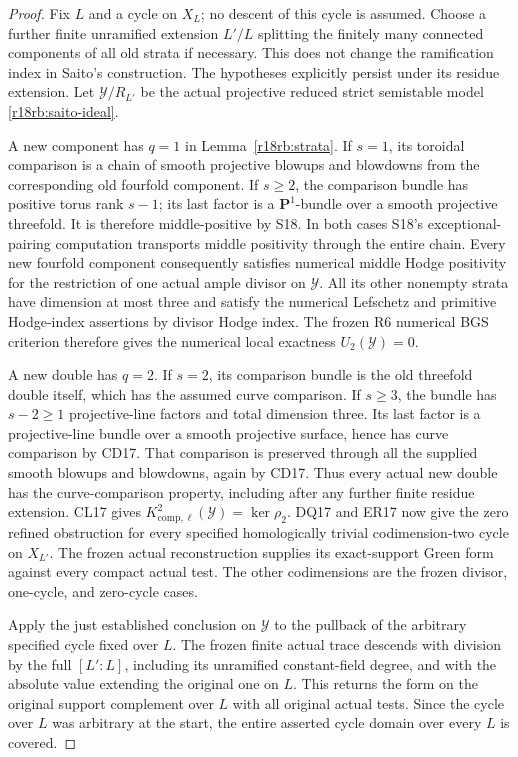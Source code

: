 \begin{proof}
Fix $L$ and a cycle on $X_L$; no descent of this cycle is assumed.
Choose a further finite unramified extension $L'/L$ splitting the
finitely many connected components of all old strata if necessary.
This does not change the ramification index in Saito's construction.
The hypotheses explicitly persist under its residue extension.
Let $\mathcal Y/R_{L'}$ be the actual projective reduced strict
semistable model \eqref{r18rb:saito-ideal}.

A new component has $q=1$ in Lemma~\ref{r18rb:strata}.
If $s=1$, its toroidal comparison is a chain of smooth projective
blowups and blowdowns from the corresponding old fourfold component.
If $s\ge2$, the comparison bundle has positive torus rank $s-1$;
its last factor is a $\mathbf P^1$-bundle over a smooth projective
threefold.  It is therefore middle-positive by S18.  In both cases
S18's exceptional-pairing computation transports middle positivity
through the entire chain.  Every new fourfold component consequently
satisfies numerical middle Hodge positivity for the restriction of
one actual ample divisor on $\mathcal Y$.  All its other nonempty
strata have dimension at most three and satisfy the numerical
Lefschetz and primitive Hodge-index assertions by divisor Hodge
index.  The frozen R6 numerical BGS criterion therefore gives the
numerical local exactness $U_2(\mathcal Y)=0$.

A new double has $q=2$.  If $s=2$, its comparison bundle is the old
threefold double itself, which has the assumed curve comparison.
If $s\ge3$, the bundle has $s-2\ge1$ projective-line factors and
total dimension three.  Its last factor is a projective-line bundle
over a smooth projective surface, hence has curve comparison by
CD17.  That comparison is preserved through all the supplied smooth
blowups and blowdowns, again by CD17.  Thus every actual new double
has the curve-comparison property, including after any further
finite residue extension.  CL17 gives
$K_{\mathrm{comp},\ell}^2(\mathcal Y)=\ker\rho_2$.
DQ17 and ER17 now give the zero refined obstruction for every
specified homologically trivial codimension-two cycle on $X_{L'}$.
The frozen actual reconstruction supplies its exact-support Green
form against every compact actual test.  The other codimensions
are the frozen divisor, one-cycle, and zero-cycle cases.

Apply the just established conclusion on $\mathcal Y$ to the
pullback of the arbitrary specified cycle fixed over $L$.  The frozen finite actual trace
descends with division by the full $[L':L]$, including its unramified
constant-field degree, and with the absolute value extending the
original one on $L$.  This returns the form on the original support
complement over $L$ with all original actual tests.  Since the cycle
over $L$ was arbitrary at the start, the entire asserted cycle
domain over every $L$ is covered.
\end{proof}

